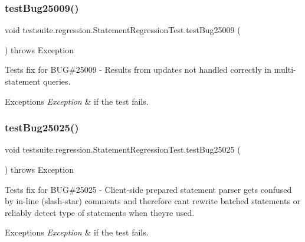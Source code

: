 \subsubsection{\texorpdfstring{test\+Bug25009()}{testBug25009()}}
{\footnotesize\ttfamily void testsuite.\+regression.\+Statement\+Regression\+Test.\+test\+Bug25009 (\begin{DoxyParamCaption}{ }\end{DoxyParamCaption}) throws Exception}

Tests fix for B\+UG\#25009 -\/ Results from updates not handled correctly in multi-\/statement queries.


\begin{DoxyExceptions}{Exceptions}
{\em Exception} & if the test fails. \\
\hline
\end{DoxyExceptions}
\mbox{\label{classtestsuite_1_1regression_1_1_statement_regression_test_ae15552bf551f9a8b5b291264142f57ae}} 
\subsubsection{\texorpdfstring{test\+Bug25025()}{testBug25025()}}
{\footnotesize\ttfamily void testsuite.\+regression.\+Statement\+Regression\+Test.\+test\+Bug25025 (\begin{DoxyParamCaption}{ }\end{DoxyParamCaption}) throws Exception}

Tests fix for B\+UG\#25025 -\/ Client-\/side prepared statement parser gets confused by in-\/line (slash-\/star) comments and therefore can\textquotesingle{}t rewrite batched statements or reliably detect type of statements when they\textquotesingle{}re used.


\begin{DoxyExceptions}{Exceptions}
{\em Exception} & if the test fails. \\
\hline
\end{DoxyExceptions}
\mbox{\label{classtestsuite_1_1regression_1_1_statement_regression_test_a67cdc2b43a1d7ac490ee30dd639ebd48}} 

